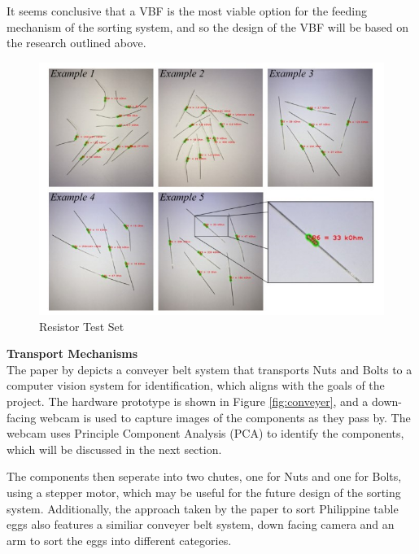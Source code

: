 It seems conclusive that a VBF is the most viable option for the feeding mechanism of the sorting system, and so the design of the VBF will be based on the research outlined above.

\begin{figure}[t]
  \begin{minipage}[t]{0.45\textwidth}
    \centering
    \includegraphics[width=\textwidth]{imgs/articles/resistordata.jpg}
    \caption{Resistor Test Set \cite{8939034}}
    \label{fig:resistordata}
  \end{minipage}
\end{figure}

\noindent
\textbf{Transport Mechanisms} \\
The paper by \citet{Dhenge2013MechanicalNS} depicts a conveyer belt system that transports Nuts and Bolts to a computer vision system for identification, which aligns with the goals of the project. 
The hardware prototype is shown in Figure \ref*{fig:conveyer}, and a down-facing webcam is used to capture images of the components as they pass by. The webcam uses Principle Component Analysis (PCA) to identify the components,
which will be discussed in the next section.

The components then seperate into two chutes, one for Nuts and one for Bolts, using a stepper motor, which may be useful for the future design of the sorting system.
Additionally, the approach taken by the paper \citet{eggsorting} to sort Philippine table eggs also features a similiar conveyer belt system, down facing camera and an arm to sort the eggs into different categories. 

